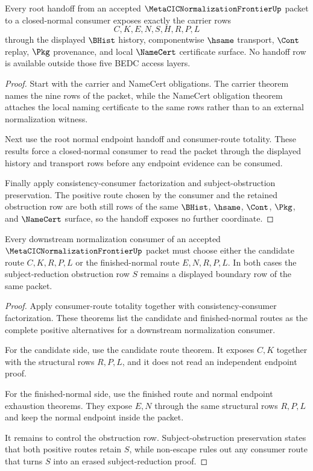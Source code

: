 \begin{theorem}
\label{thm:metacic-normalization-frontier-root-handoff-scope}
Every root handoff from an accepted $\MetaCICNormalizationFrontierUp$ packet to
a closed-normal consumer exposes exactly the carrier rows
$$
C,K,E,N,S,H,R,P,L
$$
through the displayed $\BHist$ history, componentwise $\hsame$ transport,
$\Cont$ replay, $\Pkg$ provenance, and local $\NameCert$ certificate surface.
No handoff row is available outside those five BEDC access layers.
\end{theorem}
\begin{proof}
Start with the carrier and NameCert obligations. The carrier theorem names the
nine rows of the packet, while the NameCert obligation theorem attaches the
local naming certificate to the same rows rather than to an external
normalization witness.

Next use the root normal endpoint handoff and consumer-route totality. These
results force a closed-normal consumer to read the packet through the displayed
history and transport rows before any endpoint evidence can be consumed.

Finally apply consistency-consumer factorization and subject-obstruction
preservation. The positive route chosen by the consumer and the retained
obstruction row are both still rows of the same $\BHist$, $\hsame$, $\Cont$,
$\Pkg$, and $\NameCert$ surface, so the handoff exposes no further coordinate.
\end{proof}

\begin{theorem}
\label{thm:metacic-normalization-frontier-downstream-normalization-boundary}
Every downstream normalization consumer of an accepted
$\MetaCICNormalizationFrontierUp$ packet must choose either the candidate route
$C,K,R,P,L$ or the finished-normal route $E,N,R,P,L$. In both cases the
subject-reduction obstruction row $S$ remains a displayed boundary row of the
same packet.
\end{theorem}
\begin{proof}
Apply consumer-route totality together with consistency-consumer
factorization. These theorems list the candidate and finished-normal routes as
the complete positive alternatives for a downstream normalization consumer.

For the candidate side, use the candidate route theorem. It exposes $C,K$
together with the structural rows $R,P,L$, and it does not read an independent
endpoint proof.

For the finished-normal side, use the finished route and normal endpoint
exhaustion theorems. They expose $E,N$ through the same structural rows
$R,P,L$ and keep the normal endpoint inside the packet.

It remains to control the obstruction row. Subject-obstruction preservation
states that both positive routes retain $S$, while non-escape rules out any
consumer route that turns $S$ into an erased subject-reduction proof.
\end{proof}

